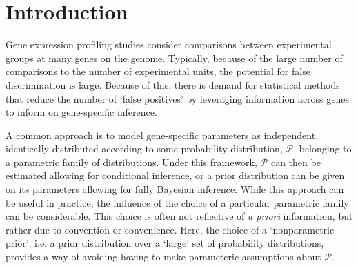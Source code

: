 \newcommand{\ind}{\stackrel{ind.}{\sim}}
\newcommand{\op}{\operatorname}
\newcommand{\code}{\texttt}

\section{Introduction}
Gene expression profiling studies consider comparisons between experimental groups at many genes on the genome. Typically, because of the large number of comparisons to the number of experimental units, the potential for false discrimination is large. Because of this, there is demand for statistical methods that reduce the number of `false positives' by leveraging information across genes to inform on gene-specific inference.


A common approach is to model gene-specific parameters as independent, identically distributed according to some probability distribution, $\mathcal{P}$, belonging to a parametric family of distributions. Under this framework, $\mathcal{P}$ can then be estimated allowing for conditional inference, or a prior distribution can be given on its parameters allowing for fully Bayesian inference. While this approach can be useful in practice, the influence of the choice of a particular parametric family can be considerable. This choice is often not reflective of \textit{a priori} information, but rather due to convention or convenience. Here, the choice of a `nonparametric prior', i.e. a prior distribution over a `large' set of probability distributions, provides a way of avoiding having to make parameteric assumptions about $\mathcal{P}$. 

